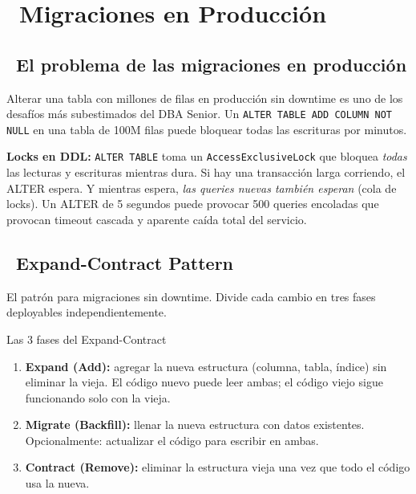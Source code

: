 \chapter[Migraciones en Producción]{~Migraciones en Producción}

\section[El problema de las migraciones en producción]{~El problema de las migraciones en producción}

Alterar una tabla con millones de filas en producción sin downtime es uno de los desafíos más subestimados del DBA Senior.
Un \texttt{ALTER TABLE ADD COLUMN NOT NULL} en una tabla de 100M filas puede bloquear todas las escrituras por minutos.

\begin{warningbox}
\textbf{Locks en DDL:} \texttt{ALTER TABLE} toma un \texttt{AccessExclusiveLock} que bloquea \emph{todas} las lecturas y escrituras mientras dura.
Si hay una transacción larga corriendo, el ALTER espera. Y mientras espera, \emph{las queries nuevas también esperan} (cola de locks).
Un ALTER de 5 segundos puede provocar 500 queries encoladas que provocan timeout cascada y aparente caída total del servicio.
\end{warningbox}

\section[Expand-Contract Pattern]{~Expand-Contract Pattern}

El patrón para migraciones sin downtime. Divide cada cambio en tres fases deployables independientemente.

\begin{teoriabox}{Las 3 fases del Expand-Contract}
\begin{enumerate}
  \item \textbf{Expand (Add):} agregar la nueva estructura (columna, tabla, índice) sin eliminar la vieja. El código nuevo puede leer ambas; el código viejo sigue funcionando solo con la vieja.
  \item \textbf{Migrate (Backfill):} llenar la nueva estructura con datos existentes. Opcionalmente: actualizar el código para escribir en ambas.
  \item \textbf{Contract (Remove):} eliminar la estructura vieja una vez que todo el código usa la nueva.
\end{enumerate}
\end{teoriabox}

